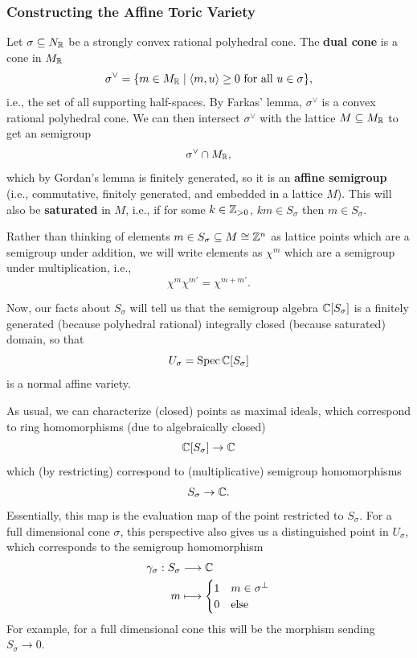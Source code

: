 \documentclass[12pt]{article}
\begin{document}
\subsubsection{Constructing the Affine Toric Variety}
Let $\sigma \subseteq N_{\mathbb{R}}$ be a strongly convex rational polyhedral cone. The \textbf{dual cone} is a cone in $M_{\mathbb{R}}$
\[\sigma^\vee = \{m\in M_{\mathbb{R}} \mid \left\langle m,u\right\rangle \geq 0 \text{ for all } u\in \sigma\},\]
i.e., the set of all supporting half-spaces. By Farkas' lemma, $\sigma^\vee$ is a convex rational polyhedral cone. We can then intersect $\sigma^\vee$ with the lattice $M\subseteq M_{\mathbb{R}}$ to get an semigroup
\[\sigma^\vee \cap M_{\mathbb{R}},\]
which by Gordan's lemma is finitely generated, so it is an \textbf{affine semigroup} (i.e., commutative, finitely generated, and embedded in a lattice $M$). This will also be \textbf{saturated} in $M$, i.e., if for some $k\in \mathbb{Z}_{>0}$, $km\in S_\sigma$ then $m\in S_\sigma$.

Rather than thinking of elements $m\in S_\sigma \subseteq M\cong \mathbb{Z}^n$ as lattice points which are a semigroup under addition, we will write elements as $\chi^m$ which are a semigroup under multiplication, i.e.,
\[\chi^m \chi^{m'} = \chi^{m+m'}.\]

Now, our facts about $S_\sigma$ will tell us that the semigroup algebra $\mathbb{C}[S_\sigma]$ is a finitely generated (because polyhedral rational) integrally closed (because saturated) domain, so that
\[U_\sigma = \operatorname{Spec} \mathbb{C}[S_\sigma]\]
is a normal affine variety.

As usual, we can characterize (closed) points as maximal ideals, which correspond to ring homomorphisms (due to algebraically closed)
\[\mathbb{C}[S_\sigma] \to \mathbb{C}\]
which (by restricting) correspond to (multiplicative) semigroup homomorphisms
\[S_\sigma \to \mathbb{C}.\]
Essentially, this map is the evaluation map of the point restricted to $S_\sigma$. For a full dimensional cone $\sigma$, this perspective also gives us a distinguished point in $U_\sigma$, which corresponds to the semigroup homomorphism
\begin{align*}
    \gamma_\sigma : S_\sigma &\longrightarrow \mathbb{C}\\
    m &\longmapsto \begin{cases}
        1 & m \in \sigma^\perp\\
        0 & \text{else}
    \end{cases}
\end{align*}
For example, for a full dimensional cone this will be the morphism sending $S_\sigma \to 0$.
\end{document}
